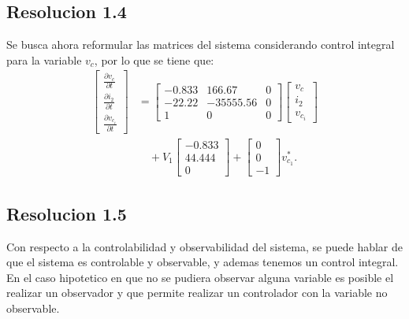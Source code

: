 \documentclass[
  11pt,
  letterpaper,
   addpoints,
   answers
  ]{exam}
\begin{document}
\begin{questions}
\begin{solution}
    \subsection{Resolucion 1.4}
    Se busca ahora reformular las matrices del sistema considerando control integral para la variable $v_{c}$, por lo que se tiene que:
    \begin{align}
        \begin{bmatrix}
        \frac{\partial v_{c}}{\partial t} \\
        \frac{\partial i_{2}}{\partial t} \\
        \frac{\partial v_{c_{i}}}{\partial t}
        \end{bmatrix} &=
        \begin{bmatrix}
        -0.833 & 166.67 & 0 \\
        -22.22 & -35555.56 & 0 \\
        1 & 0 & 0
        \end{bmatrix}
        \begin{bmatrix}
        v_{c} \\
        i_{2} \\
        v_{c_{i}}
        \end{bmatrix} \\
        &\quad + V_1
        \begin{bmatrix}
        -0.833 \\
        44.444 \\
        0
        \end{bmatrix}
        + 
        \begin{bmatrix}
        0 \\
        0 \\
        -1
        \end{bmatrix} v_{c_{1}}^{*}.
    \end{align}
    \subsection{Resolucion 1.5}
    Con respecto a la controlabilidad y observabilidad del sistema, se puede hablar de que el sistema es controlable y observable, y ademas tenemos un control integral. En el caso hipotetico en que no se pudiera observar alguna variable es posible el realizar un observador y que permite realizar un controlador con la variable no observable.
\end{solution}

\end{questions}
\newpage
\end{document}

